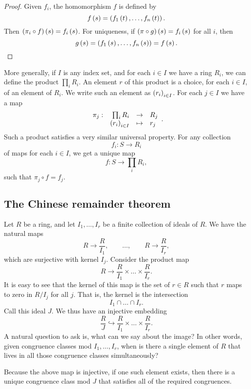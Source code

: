 \begin{proof}
Given $ f_i $, the homomorphism $ f $ is defined by
$$ f\left( s \right) = \left( f_1\left( t \right), \dots, f_n\left( t \right) \right). $$
Then $ \left( \pi_i \circ f \right)\left( s \right) = f_i\left( s \right) $. For uniqueness, if $ \left( \pi \circ g \right)\left( s \right) = f_i\left( s \right) $ for all $ i $, then
$$ g\left( s \right) = \left( f_1\left( s \right), \dots, f_n\left( s \right) \right) = f\left( s \right). $$
\end{proof}

More generally, if $ I $ is any index set, and for each $ i \in I $ we have a ring $ R_i $, we can define the product $ \prod_i R_i $. An element $ r $ of this product is a choice, for each $ i \in I $, of an element of $ R_i $. We write such an element as $ \left( r_i \right)_{i \in I} $. For each $ j \in I $ we have a map
$$ \function[\pi_j]{\prod_i R_i}{R_j}{\rb{r_i}_{i \in I}}{r_j}. $$
Such a product satisfies a very similar universal property. For any collection
$$ f_i : S \to R_i $$
of maps for each $ i \in I $, we get a unique map
$$ f : S \to \prod_i R_i, $$
such that $ \pi_j \circ f = f_j $.

\pagebreak

\subsection{The Chinese remainder theorem}

Let $ R $ be a ring, and let $ I_1, \dots, I_r $ be a finite collection of ideals of $ R $. We have the natural maps
$$ R \to \dfrac{R}{I_1}, \qquad \dots, \qquad R \to \dfrac{R}{I_r}, $$
which are surjective with kernel $ I_j $. Consider the product map
$$ R \to \dfrac{R}{I_1} \times \dots \times \dfrac{R}{I_r}. $$
It is easy to see that the kernel of this map is the set of $ r \in R $ such that $ r $ maps to zero in $ R / I_j $ for all $ j $. That is, the kernel is the intersection
$$ I_1 \cap \dots \cap I_r. $$
Call this ideal $ J $. We thus have an injective embedding
$$ \dfrac{R}{J} \hookrightarrow \dfrac{R}{I_1} \times \dots \times \dfrac{R}{I_r}. $$
A natural question to ask is, what can we say about the image? In other words, given congruence classes mod $ I_1, \dots, I_r $, when is there a single element of $ R $ that lives in all those congruence classes simultaneously?

\begin{note*}
Because the above map is injective, if one such element exists, then there is a unique congruence class mod $ J $ that satisfies all of the required congruences.
\end{note*}

